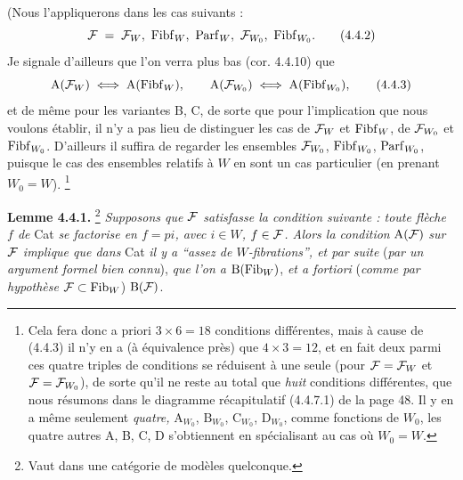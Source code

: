 (Nous l'appliquerons dans les cas suivants : %
\[
\cF \;=\; \cF_W,\ \Fibf_W,\ \Parf_W,\ \cF_{W_0},\ \Fibf_{W_0}.
\tag*{(4.4.2)}
\]
Je signale d'ailleurs que l'on verra plus bas (cor. 4.4.10) que
\[
\mathrm{A}(\mathcal{F}_W) \iff \mathrm{A}(\mathrm{Fibf}_W), \qquad \mathrm{A}(\mathcal{F}_{W_0}) \iff \mathrm{A}(\mathrm{Fibf}_{W_0}),
\tag*{(4.4.3)}
\]
et de même pour les variantes B, C, de sorte que pour l'implication que nous voulons établir, il n'y a pas lieu de distinguer les cas de $\mathcal{F}_W$ et $\mathrm{Fibf}_W$, de $\mathcal{F}_{W_0}$ et $\mathrm{Fibf}_{W_0}$. D'ailleurs il suffira de regarder les ensembles $\mathcal{F}_{W_0}$, $\mathrm{Fibf}_{W_0}$, $\mathrm{Parf}_{W_0}$, puisque le cas des ensembles relatifs à $W$ en sont un cas particulier (en prenant $W_0 = W$). \footnote[28]{Cela fera donc a priori $3 \times 6 = 18$ conditions différentes, mais à cause de (4.4.3) il n'y en a (à équivalence près) que $4 \times 3 = 12$, et en fait deux parmi ces quatre triples de conditions se réduisent à une seule (pour $\mathcal{F} = \mathcal{F}_W$ et $\mathcal{F} = \mathcal{F}_{W_0}$), de sorte qu'il ne reste au total que \textit{huit} conditions différentes, que nous résumons dans le diagramme récapitulatif (4.4.7.1) de la page 48. Il y en a même seulement \textit{quatre,} $\mathrm{A}_{W_0}$, $\mathrm{B}_{W_0}$, $\mathrm{C}_{W_0}$, $\mathrm{D}_{W_0}$, comme fonctions de $W_0$, les quatre autres A, B, C, D s'obtiennent en spécialisant au cas où $W_0 = W$.}


\textbf{Lemme 4.4.1.} \footnote[29]{Vaut dans une catégorie de modèles quelconque.} \textit{Supposons que $\mathcal{F}$ satisfasse la condition suivante : toute flèche $f$ de} Cat \textit{se factorise en $f = pi$, avec $i \in W$, $f \in \mathcal{F}$. Alors la condition} $\mathrm{A}(\mathcal{F})$ \textit{sur $\mathcal{F}$ implique que dans} Cat \textit{il y a “assez de $W$-fibrations”, et par suite} (\textit{par un argument formel bien} %
{}
\textit{connu}), \textit{que l'on a} $\mathrm{B}(\mathrm{Fib}_W)$, \textit{et a fortiori} (\textit{comme par hypothèse} $\mathcal{F} \subset \mathrm{Fib}_W$) $\mathrm{B}(\mathcal{F})$.

